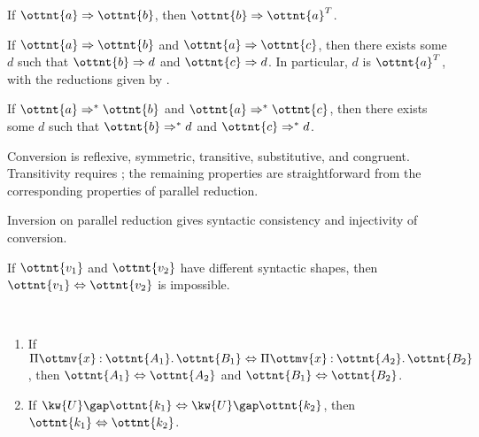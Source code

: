 \documentclass[a4paper,UKenglish,cleveref,autoref,thm-restate]{lipics-v2021}
\begin{document}
\begin{lemma}[Completion (p.r.)] \label{lem:par:compl}
  If $ \ottnt{a}  \Rightarrow  \ottnt{b} $, then $ \ottnt{b}  \Rightarrow   \ottnt{a} ^{ \mathsf{T} }  $.
\end{lemma}

\begin{corollary}[Diamond (p.r.)] \label{lem:par:diamond}
  If $ \ottnt{a}  \Rightarrow  \ottnt{b} $ and $ \ottnt{a}  \Rightarrow  \ottnt{c} $,
  then there exists some $d$ such that $ \ottnt{b}  \Rightarrow  d $ and $ \ottnt{c}  \Rightarrow  d $.
  In particular, $d$ is $ \ottnt{a} ^{ \mathsf{T} } $,
  with the reductions given by .
\end{corollary}

\begin{theorem}[Confluence (p.r.)] \label{lem:par:confl}
  If $ \ottnt{a}  \Rightarrow^\ast  \ottnt{b} $ and $ \ottnt{a}  \Rightarrow^\ast  \ottnt{c} $,
  then there exists some $d$ such that $ \ottnt{b}  \Rightarrow^\ast  d $ and $ \ottnt{c}  \Rightarrow^\ast  d $.
\end{theorem}

\begin{corollary} \label{lem:conv}
  Conversion is reflexive, symmetric, transitive, substitutive, and congruent.
  Transitivity requires ;
  the remaining properties are straightforward
  from the corresponding properties of parallel reduction.
\end{corollary}

Inversion on parallel reduction gives syntactic consistency and injectivity of conversion.

\begin{lemma} \label{lem:par:consistency}
  If $\ottnt{v_{{\mathrm{1}}}}$ and $\ottnt{v_{{\mathrm{2}}}}$ have different syntactic shapes,
  then $ \ottnt{v_{{\mathrm{1}}}}  \Leftrightarrow  \ottnt{v_{{\mathrm{2}}}} $ is impossible.
\end{lemma}

\begin{lemma} ~
  \begin{enumerate}[topsep=0pt]
    \item If $  \Pi  \ottmv{x}  \mathbin{:}  \ottnt{A_{{\mathrm{1}}}}  \mathpunct{.}  \ottnt{B_{{\mathrm{1}}}}   \Leftrightarrow   \Pi  \ottmv{x}  \mathbin{:}  \ottnt{A_{{\mathrm{2}}}}  \mathpunct{.}  \ottnt{B_{{\mathrm{2}}}}  $, then $ \ottnt{A_{{\mathrm{1}}}}  \Leftrightarrow  \ottnt{A_{{\mathrm{2}}}} $ and $ \ottnt{B_{{\mathrm{1}}}}  \Leftrightarrow  \ottnt{B_{{\mathrm{2}}}} $.
    \item If $  \kw{U} \gap  \ottnt{k_{{\mathrm{1}}}}   \Leftrightarrow   \kw{U} \gap  \ottnt{k_{{\mathrm{2}}}}  $, then $ \ottnt{k_{{\mathrm{1}}}}  \Leftrightarrow  \ottnt{k_{{\mathrm{2}}}} $.
  \end{enumerate}
\end{lemma}
\end{document}
